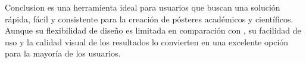 \vspace{-0.7em}
\begin{block}{Conclusion}
     es una herramienta ideal para usuarios que buscan una solución rápida,
    fácil y consistente para la creación de pósteres académicos y científicos.
    Aunque su flexibilidad de diseño es limitada en comparación con ,
    su facilidad de uso y la calidad visual de los resultados lo convierten en una excelente opción para la mayoría de los usuarios.
\end{block}